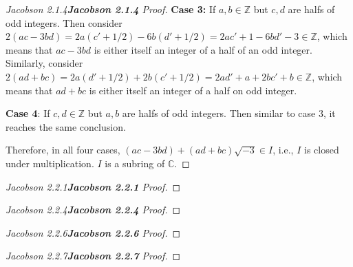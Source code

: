 \documentclass[12pt]{article}
\newenvironment{fproof}[1][]
  {\begin{proof}[\ifx\relax#1\relax\else\textbf{\large #1} Proof\fi]}
  {\end{proof}}
\begin{document}
\begin{fproof}[Jacobson 2.1.4]
  \textbf{Case 3:} If \(a,b \in \mathbb{Z}\) but \(c,d\) are halfs of odd integers.
  Then consider \(2(ac - 3bd) = 2a(c' + 1/2) -6b(d'+1/2) = 2ac' + 1 - 6bd' - 3 \in \mathbb{Z}\), which means that \(ac - 3bd\) is either itself an integer of a half of an odd integer.
  Similarly, consider \(2(ad+bc) = 2a(d'+1/2) + 2b(c'+1/2) = 2ad'+a + 2bc' + b \in \mathbb{Z}\), which means that \(ad + bc\) is either itself an integer of a half on odd integer.

  \textbf{Case 4}: If \(c,d \in \mathbb{Z}\) but \(a,b\) are halfs of odd integers. Then similar to case 3, it reaches the same conclusion.

  Therefore, in all four cases, \((ac - 3bd) + (ad + bc) \sqrt{-3} \in I\), i.e., \(I\) is closed under multiplication.
  \(I\) is a subring of \(\mathbb{C}\).


\end{fproof}

\newpage

\begin{fproof}[Jacobson 2.2.1]
\end{fproof}

\newpage

\begin{fproof}[Jacobson 2.2.4]
\end{fproof}

\newpage

\begin{fproof}[Jacobson 2.2.6]
\end{fproof}

\newpage

\begin{fproof}[Jacobson 2.2.7]
\end{fproof}
\end{document}
